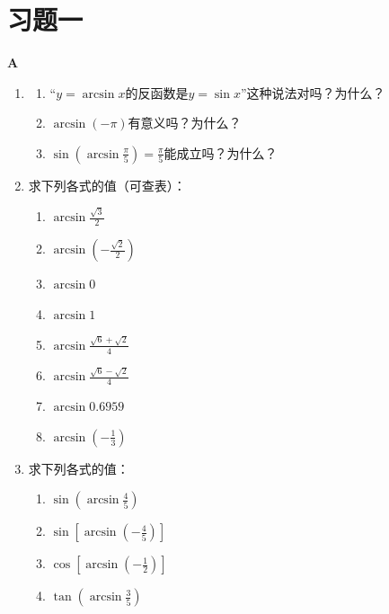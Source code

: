\section*{习题一}
\begin{center}
\bfseries A
\end{center}

\begin{enumerate}
    \item \begin{enumerate}[(1)]
        \item “$y=\arcsin x$的反函数是$y=\sin x$”这种说法对吗？为什么？
        \item $\arcsin(-\pi)$有意义吗？为什么？
        \item $\sin\left(\arcsin \frac{\pi}{5}\right)=\frac{\pi}{5}$能成立吗？为什么？
    \end{enumerate}
\item 求下列各式的值（可查表）：
\begin{multicols}{2}
\begin{enumerate}[(1)]
    \item $\arcsin \frac{\sqrt{3}}{2}$
    \item $\arcsin \left(-\frac{\sqrt{2}}{2}\right)$
    \item $\arcsin 0$
    \item $\arcsin 1$
    \item $\arcsin \frac{\sqrt{6}+\sqrt{2}}{4}$
    \item $\arcsin\frac{\sqrt{6}-\sqrt{2}}{4}$
    \item $\arcsin 0.6959$
    \item $\arcsin \left(-\frac{1}{3}\right)$
\end{enumerate}
\end{multicols}

\item 求下列各式的值： 
\begin{multicols}{2}
\begin{enumerate}[(1)]
    \item $\sin \left(\arcsin \frac{4}{5}\right)$
    \item $\sin \left[\arcsin\left(-\frac{4}{5}\right)\right]$
    \item $\cos\left[\arcsin\left(-\frac{1}{2}\right)\right]$
    \item $\tan\left(\arcsin \frac{3}{5}\right) $
\end{enumerate}
\end{multicols}
\end{enumerate}

